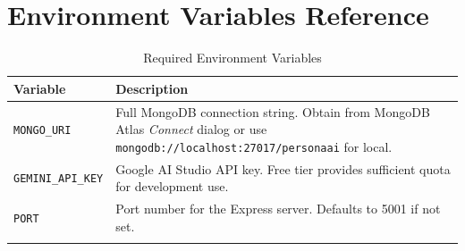 \documentclass[12pt,a4paper]{report}
\begin{document}
\section{Environment Variables Reference}

\begin{longtable}{@{}p{3.5cm} p{9cm}@{}}
\toprule
\textbf{Variable} & \textbf{Description} \\
\midrule
\endhead
\texttt{MONGO\_URI} & Full MongoDB connection string. Obtain from MongoDB Atlas \textit{Connect} dialog or use \texttt{mongodb://localhost:27017/personaai} for local. \\
\texttt{GEMINI\_API\_KEY} & Google AI Studio API key. Free tier provides sufficient quota for development use. \\
\texttt{PORT} & Port number for the Express server. Defaults to 5001 if not set. \\
\bottomrule
\caption{Required Environment Variables}
\end{longtable}
\end{document}
